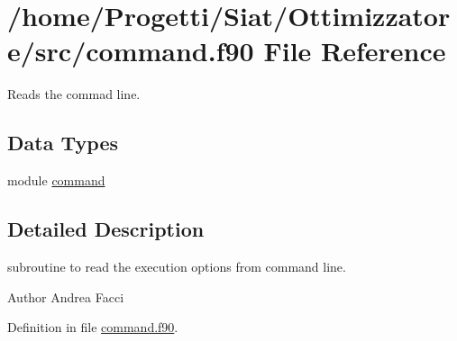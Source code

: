 \hypertarget{command_8f90}{\section{/home/\-Progetti/\-Siat/\-Ottimizzatore/src/command.f90 File Reference}
\label{command_8f90}
}


Reads the commad line.  


\subsection*{Data Types}
\begin{DoxyCompactItemize}
\item 
module \hyperlink{classcommand}{command}
\end{DoxyCompactItemize}


\subsection{Detailed Description}
subroutine to read the execution options from command line. \begin{DoxyAuthor}{Author}
Andrea Facci 
\end{DoxyAuthor}


Definition in file \hyperlink{command_8f90_source}{command.\-f90}.

